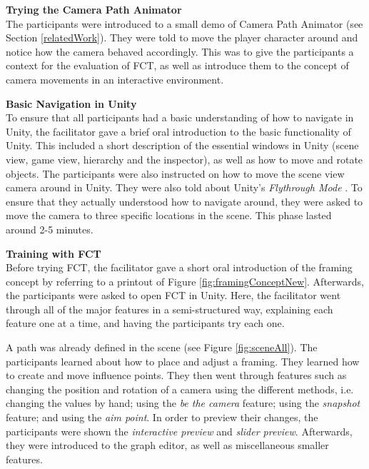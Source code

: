 \textbf{Trying the Camera Path Animator}\\
The participants were introduced to a small demo of Camera Path Animator \cite{unity_camTool} (see Section \ref{relatedWork}). They were told to move the player character around and notice how the camera behaved accordingly. This was to give the participants a context for the evaluation of FCT, as well as introduce them to the concept of camera movements in an interactive environment.




\textbf{Basic Navigation in Unity}\\
To ensure that all participants had a basic understanding of how to navigate in Unity, the facilitator gave a brief oral introduction to the basic functionality of Unity. This included a short description of the essential windows in Unity (scene view, game view, hierarchy and the inspector), as well as how to move and rotate objects. The participants were also instructed on how to move the scene view camera around in Unity. They were also told about Unity's \textit{Flythrough Mode} \cite{unity_flyMode}. To ensure that they actually understood how to navigate around, they were asked to move the camera to three specific locations in the scene. This phase lasted around 2-5 minutes.


\textbf{Training with FCT}\\
Before trying FCT, the facilitator gave a short oral introduction of the framing concept by referring to a printout of Figure \ref{fig:framingConceptNew}. Afterwards, the participants were asked to open FCT in Unity. Here, the facilitator went through all of the major features in a semi-structured way, explaining each feature one at a time, and having the participants try each one.

A path was already defined in the scene (see Figure \ref{fig:sceneAll}). The participants learned about how to place and adjust a framing. They learned how to create and move influence points. They then went through features such as changing the position and rotation of a camera using the different methods, i.e. changing the values by hand; using the \textit{be the camera} feature; using the \textit{snapshot} feature; and using the \textit{aim point}. In order to preview their changes, the participants were shown the \textit{interactive preview} and \textit{slider preview}. Afterwards, they were introduced to the graph editor, as well as miscellaneous smaller features.

